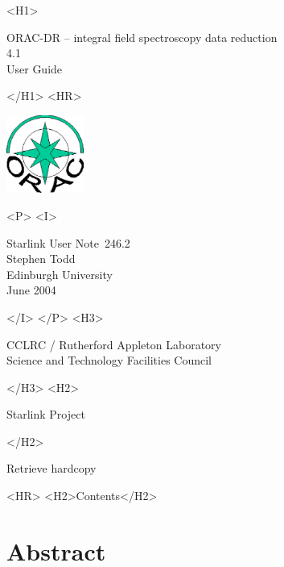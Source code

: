 \documentclass[twoside,11pt]{article}
\newcommand{\stardoccategory}  {Starlink User Note}
\newcommand{\stardocsource}    {sun\stardocnumber}
\newcommand{\stardocnumber}    {246.2}
\newcommand{\stardocauthors}   {Stephen Todd \\
                                Edinburgh University}
\newcommand{\stardocdate}      {June 2004}
\newcommand{\stardoctitle}     {ORAC-DR -- integral field spectroscopy
  data reduction}
\newcommand{\stardocversion}   {4.1}
\newcommand{\stardocmanual}    {User Guide}
\newcommand{\htmladdnormallink}[2]{#1}
\newcommand{\htmladdimg}[1]{}
\newcommand{\htmlref}[2]{#1}
\newcommand{\htmladdtonavigation}[1]{}
\newcommand{\xlabel}[1]{}
\renewcommand{\_}{\texttt{\symbol{95}}}
\begin{document}
\begin{htmlonly}
   \xlabel{}
   \begin{rawhtml} <H1> \end{rawhtml}
      \stardoctitle\\
      \stardocversion\\
      \stardocmanual
   \begin{rawhtml} </H1> <HR> \end{rawhtml}

\includegraphics[width=1.0in]{sun246_logo.eps}

   \begin{rawhtml} <P> <I> \end{rawhtml}
   \stardoccategory\ \stardocnumber \\
   \stardocauthors \\
   \stardocdate
   \begin{rawhtml} </I> </P> <H3> \end{rawhtml}
      \htmladdnormallink{CCLRC / Rutherford Appleton Laboratory}
                        {http://www.cclrc.ac.uk} \\
      \htmladdnormallink{Science and Technology Facilities Council}
                        {http://www.stfc.ac.uk} \\
   \begin{rawhtml} </H3> <H2> \end{rawhtml}
      \htmladdnormallink{Starlink Project}{http://www.starlink.ac.uk/}
   \begin{rawhtml} </H2> \end{rawhtml}
   \htmladdnormallink{\htmladdimg{source.gif} Retrieve hardcopy}
      {http://www.starlink.ac.uk/cgi-bin/hcserver?\stardocsource}\\

  \label{stardoccontents}
  \begin{rawhtml}
    <HR>
    <H2>Contents</H2>
  \end{rawhtml}
  \htmladdtonavigation{\htmlref{\htmladdimg{contents_motif.gif}}
        {stardoccontents}}

  \section{\xlabel{abstract}Abstract}
\end{htmlonly}
\end{document}
